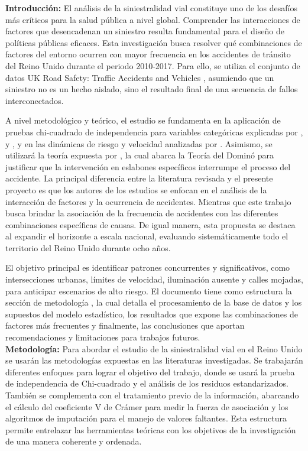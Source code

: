 \documentclass[12pt]{article}
\begin{document}
\textbf{Introducción:}
  El análisis de la siniestralidad vial constituye uno de los desafíos más críticos
  para la salud pública a nivel global. Comprender las interacciones de factores que
  desencadenan un siniestro resulta fundamental para el diseño de políticas públicas 
  eficaces. Esta investigación busca resolver qué combinaciones de factores del 
  entorno ocurren con mayor frecuencia en los accidentes de tránsito del Reino Unido
  durante el periodo 2010-2017. Para ello, se utiliza el conjunto de datos UK Road 
  Safety: Traffic Accidents and Vehicles , asumiendo que un siniestro no es un hecho 
  aislado, sino el resultado final de una secuencia de fallos interconectados.
  
  A nivel metodológico y teórico, el estudio se fundamenta en la aplicación de
  pruebas chi-cuadrado de independencia para variables categóricas explicadas
  por \textcite{McHugh2013}, \textcite{LASTRE2019} y \textcite{Agresti2002}, y 
  en las dinámicas de riesgo y velocidad analizadas por \textcite{TAYLOR2000}. 
  Asimismo, se utilizará la teoría expuesta por \textcite{SAXENA2017}, la cual 
  abarca la Teoría del Dominó para justificar que la intervención en eslabones 
  específicos interrumpe el proceso del accidente. La principal diferencia entre 
  la literatura revisada y el presente proyecto es que los autores de los estudios 
  se enfocan en el análisis de la interacción de factores y la ocurrencia de 
  accidentes. Mientras que este trabajo busca brindar la asociación de la frecuencia
  de accidentes con las diferentes combinaciones específicas de causas. De igual 
  manera, esta propuesta se destaca al expandir el horizonte a escala nacional, 
  evaluando sistemáticamente todo el territorio del Reino Unido durante ocho años.
  
  El objetivo principal es identificar patrones concurrentes y significativos, 
  como intersecciones urbanas, límites de velocidad, iluminación ausente y calles 
  mojadas, para anticipar escenarios de alto riesgo. El documento tiene como 
  estructura la sección de metodología , la cual detalla el procesamiento de la
  base de datos y los supuestos del modelo estadístico, los resultados que expone
  las combinaciones de factores más frecuentes y finalmente, las conclusiones que 
  aportan recomendaciones y limitaciones para trabajos futuros. \\

\textbf{Metodología:}
  Para abordar el estudio de la siniestralidad vial en el Reino Unido se usarán 
  las metodologías expuestas en las literaturas investigadas. Se trabajarán diferentes 
  enfoques para lograr el objetivo del trabajo, donde se usará la prueba de independencia 
  de Chi-cuadrado y el análisis de los residuos estandarizados. También se complementa  
  con el tratamiento previo de la información, abarcando el cálculo del coeficiente 
  V de Crámer para medir la fuerza de asociación y los algoritmos de imputación 
  para el manejo de valores faltantes. Esta estructura permite entrelazar las 
  herramientas teóricas con los objetivos de la investigación de una manera 
  coherente y ordenada.
  
\end{document}

